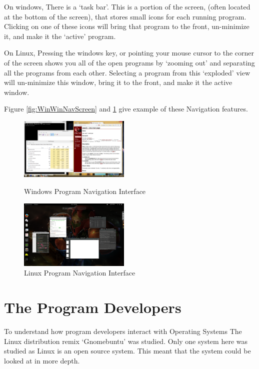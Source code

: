 \documentclass[a4paper]{report}
\begin{document}
On windows, There is a `task bar'. This is a portion of the screen, (often located at the bottom of the screen), that stores small icons for each running program. Clicking on one of these icons will bring that program to the front, un-minimize it, and make it the `active' program.

On Linux, Pressing the windows key, or pointing your mouse cursor to the corner of the screen shows you all of the open programs by `zooming out' and separating all the programs from each other. Selecting a program from this `exploded' view will un-minimize this window, bring it to the front, and make it the active window.

Figure \ref{fig:WinWinNavScreen} and \ref{fig:LinWinNavScreen} give example of these Navigation features.

\begin{figure}[ht]
\centering
\begin{minipage}{.5\textwidth}
  \centering
  \includegraphics[width=200px]{images/Windows_Window_Navigation_Screenshot}
  \caption{Windows Program Navigation Interface}
  \label{fig:WinWinNavScreen}
\end{minipage}%
\begin{minipage}{.5\textwidth}
  \centering
  \includegraphics[width=200px]{images/Linux_Window_Navigation_Screenshot}
  \caption{Linux Program Navigation Interface}
  \label{fig:LinWinNavScreen}
\end{minipage}
\end{figure}


\clearpage
\section{The Program Developers}

To understand how program developers interact with Operating Systems The Linux distribution remix `Gnomebuntu' was studied. Only one system here was studied as Linux is an open source system. This meant that the system could be looked at in more depth.
\end{document}
